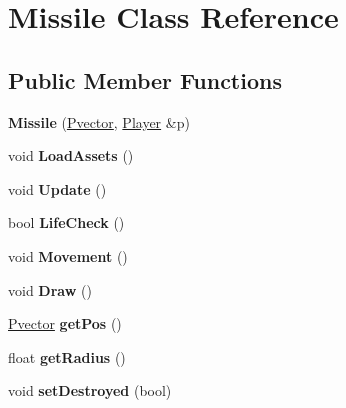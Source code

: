 \hypertarget{class_missile}{}\section{Missile Class Reference}
\label{class_missile}
\subsection*{Public Member Functions}
\begin{DoxyCompactItemize}
\item 
{\bfseries Missile} (\hyperlink{class_pvector}{Pvector}, \hyperlink{class_player}{Player} \&p)\hypertarget{class_missile_a486c5930b538aac8b868cb72e26e0aa2}{}\label{class_missile_a486c5930b538aac8b868cb72e26e0aa2}

\item 
void {\bfseries Load\+Assets} ()\hypertarget{class_missile_a9e703621eaacbc90cde9c2972af9da22}{}\label{class_missile_a9e703621eaacbc90cde9c2972af9da22}

\item 
void {\bfseries Update} ()\hypertarget{class_missile_a67ad40ce9019f783cfd88c438e301123}{}\label{class_missile_a67ad40ce9019f783cfd88c438e301123}

\item 
bool {\bfseries Life\+Check} ()\hypertarget{class_missile_aafa58d766ceabd86866a6e98be1f3d43}{}\label{class_missile_aafa58d766ceabd86866a6e98be1f3d43}

\item 
void {\bfseries Movement} ()\hypertarget{class_missile_a0ad78df6fcc042fb297279eade71e58e}{}\label{class_missile_a0ad78df6fcc042fb297279eade71e58e}

\item 
void {\bfseries Draw} ()\hypertarget{class_missile_ad01229ab0416b2c7b680893aaea207e2}{}\label{class_missile_ad01229ab0416b2c7b680893aaea207e2}

\item 
\hyperlink{class_pvector}{Pvector} {\bfseries get\+Pos} ()\hypertarget{class_missile_a3274049c11b63589b934df4fdc5fff56}{}\label{class_missile_a3274049c11b63589b934df4fdc5fff56}

\item 
float {\bfseries get\+Radius} ()\hypertarget{class_missile_a48742215f9c57684a945fef5096065b8}{}\label{class_missile_a48742215f9c57684a945fef5096065b8}

\item 
void {\bfseries set\+Destroyed} (bool)\hypertarget{class_missile_aeb2f1251c3820b203bc40dae545b3d37}{}\label{class_missile_aeb2f1251c3820b203bc40dae545b3d37}


\end{DoxyCompactItemize}
